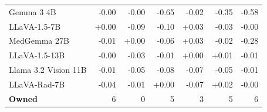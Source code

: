 \documentclass{article}
\begin{document}
\begin{table}[htbp]
\begin{tabular}{lrrrrrr}
Gemma 3 4B & \cellcolor{cfSlate1}-0.00 & \cellcolor{cfSlate1}-0.00 & \cellcolor{cfSlate4}-0.65 & \cellcolor{cfSlate1}-0.02 & \cellcolor{cfSlate4}-0.35 & \cellcolor{cfSlate4}-0.58 \\
LLaVA-1.5-7B & \cellcolor{cfTerra1}+0.00 & \cellcolor{cfSlate2}-0.09 & \cellcolor{cfSlate2}-0.10 & \cellcolor{cfTerra2}+0.03 & \cellcolor{cfSlate2}-0.03 & \cellcolor{cfSlate1}-0.00 \\
MedGemma 27B & \cellcolor{cfSlate1}-0.01 & \cellcolor{cfTerra1}+0.00 & \cellcolor{cfSlate2}-0.06 & \cellcolor{cfTerra2}+0.03 & \cellcolor{cfSlate1}-0.02 & \cellcolor{cfSlate4}-0.28 \\
LLaVA-1.5-13B & \cellcolor{cfSlate1}-0.00 & \cellcolor{cfSlate2}-0.03 & \cellcolor{cfSlate1}-0.01 & \cellcolor{cfTerra1}+0.00 & \cellcolor{cfTerra1}+0.01 & \cellcolor{cfSlate1}-0.01 \\
Llama 3.2 Vision 11B & \cellcolor{cfSlate1}-0.01 & \cellcolor{cfSlate2}-0.05 & \cellcolor{cfSlate2}-0.08 & \cellcolor{cfSlate2}-0.07 & \cellcolor{cfSlate2}-0.05 & \cellcolor{cfSlate1}-0.01 \\
LLaVA-Rad-7B & \cellcolor{cfSlate2}-0.04 & \cellcolor{cfSlate1}-0.01 & \cellcolor{cfTerra1}+0.00 & \cellcolor{cfSlate2}-0.07 & \cellcolor{cfTerra2}+0.02 & \cellcolor{cfSlate1}-0.00 \\
\midrule
\textbf{Owned} & 6 & 0 & 5 & 3 & 5 & 6 \\
\bottomrule
\end{tabular}
\end{table}
\end{document}

